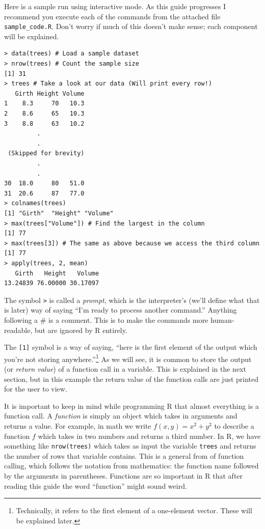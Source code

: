 \documentclass[12pt]{article}
\begin{document}
Here is a sample run using interactive mode. As this guide progresses I recommend you execute each of the commands from the attached file \verb|sample_code.R|. Don't worry if much of this doesn't make sense; each component will be explained.

\begin{Verbatim}[frame=single, fontsize=\small]
> data(trees) # Load a sample dataset
> nrow(trees) # Count the sample size
[1] 31
> trees # Take a look at our data (Will print every row!)
   Girth Height Volume
1    8.3     70   10.3
2    8.6     65   10.3
3    8.8     63   10.2
         .
         .
 (Skipped for brevity)
         .
         .
30  18.0     80   51.0
31  20.6     87   77.0
> colnames(trees)
[1] "Girth"  "Height" "Volume"
> max(trees["Volume"]) # Find the largest in the column
[1] 77
> max(trees[3]) # The same as above because we access the third column
[1] 77
> apply(trees, 2, mean)
   Girth   Height   Volume 
13.24839 76.00000 30.17097
\end{Verbatim}

The symbol \verb|>| is called a \emph{prompt}, which is the interpreter's (we'll define what that is later) way of saying ``I'm ready to process another command.'' Anything following a \# is a comment. This is to make the commands more human-readable, but are ignored by R entirely.

The \verb|[1]| symbol is a way of saying, ``here is the first element of the output which you're not storing anywhere.''\footnote{Technically, it refers to the first element of a one-element vector. These will be explained later.} As we will see, it is common to store the output (or \emph{return value}) of a function call in a variable. This is explained in the next section, but in this example the return value of the function calls are just printed for the user to view.

It is important to keep in mind while programming R that almost everything is a function call. A \emph{function} is simply an object which takes in arguments and returns a value. For example, in math we write $f(x, y) = x^2 + y^2$ to describe a function $f$ which takes in two numbers and returns a third number. In R, we have something like \verb|nrow(trees)| which takes as input the variable \verb|trees| and returns the number of rows that variable contains. This is a general from of function calling, which follows the notation from mathematics: the function name followed by the arguments in parentheses. Functions are so important in R that after reading this guide the word ``function'' might sound weird.
\end{document}
